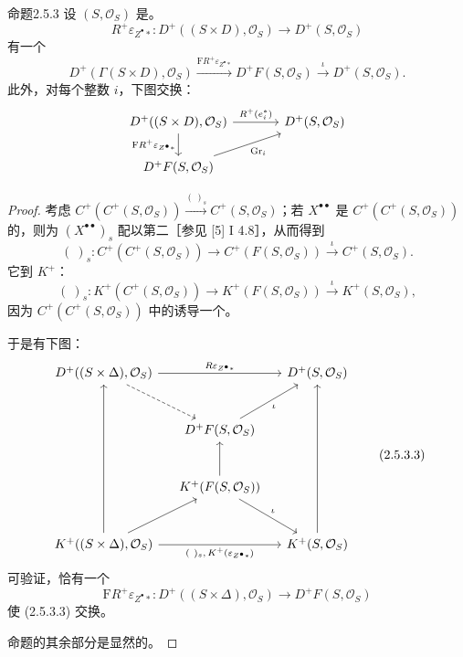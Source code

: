 \begin{SGAresult}{命题}{2.5.3}
设 $(S,\mathcal O_S)$ 是。
\[
R^+\varepsilon_{Z^\bullet*}:D^+((S\times D),\mathcal O_S)\longrightarrow D^+(S,\mathcal O_S)
\]
有一个
\[
D^+(\Gamma(S\times D),\mathcal O_S)
\xrightarrow{\mathrm F R^+\varepsilon_{Z^\bullet*}}
D^+F(S,\mathcal O_S)\xrightarrow{\iota}D^+(S,\mathcal O_S).
\]
此外，对每个整数 $i$，下图交换：
\[
\begin{tikzcd}[column sep=large]
D^+((S\times D),\mathcal O_S)\arrow[r,"R^+(e_i^*)"]\arrow[d,"\mathrm F R^+\varepsilon_{Z^\bullet*}"']&D^+(S,\mathcal O_S)\\
D^+F(S,\mathcal O_S)\arrow[ur,"\operatorname{Gr}_i"']&
\end{tikzcd}
\]
\end{SGAresult}
\begin{proof}
考虑 $C^+(C^+(S,\mathcal O_S))\xrightarrow{(\ )_s}C^+(S,\mathcal O_S)$；若 $X^{\bullet\bullet}$ 是 $C^+(C^+(S,\mathcal O_S))$ 的，则为 $(X^{\bullet\bullet})_s$ 配以第二［参见 [5] I 4.8］，从而得到
\[
(\ )_s:C^+(C^+(S,\mathcal O_S))\longrightarrow
C^+(F(S,\mathcal O_S))\xrightarrow{\iota}C^+(S,\mathcal O_S). \tag{2.5.3.1}
\]
它到 $K^+$：
\[
(\ )_s:K^+(C^+(S,\mathcal O_S))\longrightarrow
K^+(F(S,\mathcal O_S))\xrightarrow{\iota}K^+(S,\mathcal O_S), \tag{2.5.3.2}
\]
因为 $C^+(C^+(S,\mathcal O_S))$ 中的诱导一个。

于是有下图：
\[
\begin{tikzcd}[column sep=small,row sep=large]
D^+((S\times\Delta),\mathcal O_S)\arrow[rr,"R\varepsilon_{Z^\bullet*}"]\arrow[dr,dashed]&&D^+(S,\mathcal O_S)\\
&D^+F(S,\mathcal O_S)\arrow[ur,"\iota"']&\\
&K^+(F(S,\mathcal O_S))\arrow[u]\arrow[dr,"\iota"]&\\
K^+((S\times\Delta),\mathcal O_S)\arrow[uuu]\arrow[ur]\arrow[rr,"{(\ )_s,\,K^+(\varepsilon_{Z^\bullet*})}"']&&K^+(S,\mathcal O_S)\arrow[uuu]
\end{tikzcd}\tag{2.5.3.3}
\]
可验证，恰有一个
\[
\mathrm F R^+\varepsilon_{Z^\bullet*}:D^+((S\times\Delta),\mathcal O_S)\longrightarrow D^+F(S,\mathcal O_S)
\]
使 (2.5.3.3) 交换。

命题的其余部分是显然的。
\end{proof}

